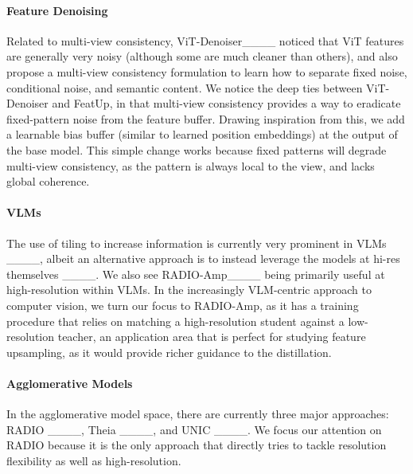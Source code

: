 \paragraph{Feature Denoising}
Related to multi-view consistency, ViT-Denoiser____ noticed that ViT features are generally very noisy (although some are much cleaner than others), and also propose a multi-view consistency formulation to learn how to separate fixed noise, conditional noise, and semantic content. We notice the deep ties between ViT-Denoiser and FeatUp, in that multi-view consistency provides a way to eradicate fixed-pattern noise from the feature buffer. Drawing inspiration from this, we add a learnable bias buffer (similar to learned position embeddings) at the output of the base model. This simple change works because fixed patterns will degrade multi-view consistency, as the pattern is always local to the view, and lacks global coherence.

\paragraph{VLMs}
The use of tiling to increase information is currently very prominent in VLMs ____, albeit an alternative approach is to instead leverage the models at hi-res themselves ____. We also see RADIO-Amp____ being primarily useful at high-resolution within VLMs. In the increasingly VLM-centric approach to computer vision, we turn our focus to RADIO-Amp, as it has a training procedure that relies on matching a high-resolution student against a low-resolution teacher, an application area that is perfect for studying feature upsampling, as it would provide richer guidance to the distillation.

\paragraph{Agglomerative Models}
In the agglomerative model space, there are currently three major approaches: RADIO ____, Theia ____, and UNIC ____. We focus our attention on RADIO because it is the only approach that directly tries to tackle resolution flexibility as well as high-resolution.